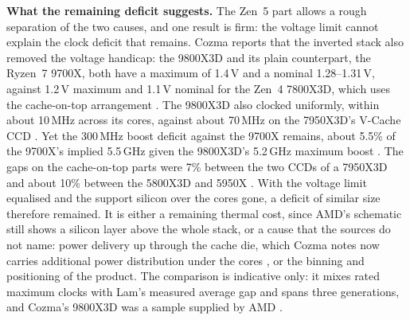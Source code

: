 \textbf{What the remaining deficit suggests.} The Zen~5 part allows a rough separation of the two causes, and one result is firm: the voltage limit cannot explain the clock deficit that remains. Cozma reports that the inverted stack also removed the voltage handicap: the 9800X3D and its plain counterpart, the Ryzen~7 9700X, both have a maximum of 1.4\,V and a nominal 1.28--1.31\,V, against 1.2\,V maximum and 1.1\,V nominal for the Zen~4 7800X3D, which uses the cache-on-top arrangement \cite{cozmaAMDs9800X3D2nd2024}. The 9800X3D also clocked uniformly, within about 10\,MHz across its cores, against about 70\,MHz on the 7950X3D's V-Cache CCD \cite{cozmaAMDs9800X3D2nd2024}. Yet the 300\,MHz boost deficit against the 9700X remains, about 5.5\% of the 9700X's implied 5.5\,GHz given the 9800X3D's 5.2\,GHz maximum boost \cite{cozmaAMDs9800X3D2nd2024,advancedmicrodevicesinc.AMDRyzen72024}. The gaps on the cache-on-top parts were 7\% between the two CCDs of a 7950X3D and about 10\% between the 5800X3D and 5950X \cite{lamAMDs7950X3DZen2023}. With the voltage limit equalised and the support silicon over the cores gone, a deficit of similar size therefore remained. It is either a remaining thermal cost, since AMD's schematic still shows a silicon layer above the whole stack, or a cause that the sources do not name: power delivery up through the cache die, which Cozma notes now carries additional power distribution under the cores \cite{cozmaAMDs9800X3D2nd2024}, or the binning and positioning of the product. The comparison is indicative only: it mixes rated maximum clocks with Lam's measured average gap and spans three generations, and Cozma's 9800X3D was a sample supplied by AMD \cite{cozmaAMDs9800X3D2nd2024}.

